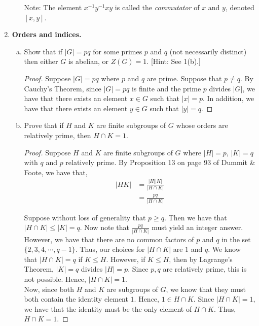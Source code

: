 \documentclass[11pt, reqno]{amsart}
\theoremstyle{plain}
\theoremstyle{definition}
\theoremstyle{example}
\begin{document}
\begin{enumerate}[1.]
\begin{enumerate}[(a)]
\smallskip

Note: The element $x^{-1} y^{-1} xy$ is called the \emph{commutator} of $x$ and $y$, denoted $[x,y]$.
\end{enumerate}

\item {\bf Orders and indices.} 

\begin{enumerate}[(a)]
\item Show that if $|G| = pq$ for some primes $p$ and $q$ (not necessarily distinct) then either $G$ is abelian, or $Z(G) = 1$. \hfill {\small[Hint: See 1(b).]}
\begin{proof}
Suppose $|G| = pq$ where $p$ and $q$ are prime. Suppose that $p \neq q$. By Cauchy's Theorem, since $|G| = pq$ is finite and the prime $p$ divides $|G|$, we have that there exists an element $x \in G$ such that $|x| = p$. In addition, we have that there exists an element $y \in G$ such that $|y| = q$.
\end{proof}

\item Prove that if $H$ and $K$ are finite subgroups of $G$ whose orders are relatively prime, then $H \cap K = 1$. 

\begin{proof}
Suppose $H$ and $K$ are finite subgroups of $G$ where $|H| = p$, $|K| = q$ with $q$ and $p$ relatively prime. By Proposition 13 on page 93 of Dummit \& Foote, we have that,
\begin{align*}
|HK| &= \frac{|H||K|}{|H \cap K|}\\
&= \frac{pq}{|H \cap K|}
\end{align*}

Suppose without loss of generality that $p \geq q$. Then we have that $|H \cap K| \leq |K| = q$. Now note that $\frac{pq}{|H \cap K|}$ must yield an integer answer. However, we have that there are no common factors of $p$ and $q$ in the set $\{2, 3, 4, \cdots, q-1\}$. Thus, our choices for $|H \cap K|$ are $1$ and $q$. We know that $|H \cap K| = q$ if $K \le H$. However, if $K \le H$, then by Lagrange's Theorem, $|K| = q$ divides $|H| = p$. Since $p, q$ are relatively prime, this is not possible. Hence, $|H \cap K| = 1$.\\

Now, since both $H$ and $K$ are subgroups of $G$, we know that they must both contain the identity element $1$. Hence, $1 \in H \cap K$. Since $|H \cap K| = 1$, we have that the identity must be the only element of $H \cap K$. Thus, $H \cap K = 1$.
\end{proof}


\end{enumerate}
\end{enumerate}
\end{document}
